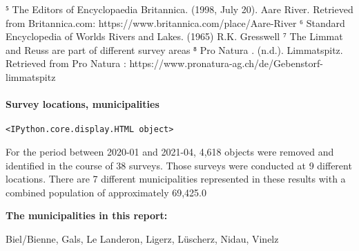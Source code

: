 \documentclass[11pt]{article}
\begin{document}
{⁵ The Editors of Encyclopaedia Britannica. (1998, July 20). Aare River.
Retrieved from Britannica.com:
https://www.britannica.com/place/Aare-River ⁶ Standard Encyclopedia of
Worlds Rivers and Lakes. (1965) R.K. Gresswell ⁷ The Limmat and Reuss
are part of different survey areas ⁸ Pro Natura . (n.d.). Limmatspitz.
Retrieved from Pro Natura :
https://www.pronatura-ag.ch/de/Gebenstorf-limmatspitz}

    

    \hypertarget{survey-locations-municipalities}{%
\paragraph{Survey locations,
municipalities}\label{survey-locations-municipalities}}

            \begin{tcolorbox}[breakable, size=fbox, boxrule=.5pt, pad at break*=1mm, opacityfill=0]
\begin{Verbatim}[commandchars=\\\{\}]
<IPython.core.display.HTML object>
\end{Verbatim}
\end{tcolorbox}
         
            
    
    For the period between 2020-01 and 2021-04, 4,618 objects were removed
and identified in the course of 38 surveys. Those surveys were conducted
at 9 different locations. There are 7 different municipalities
represented in these results with a combined population of approximately
69,425.0

    
 
            
    
    \textbf{The municipalities in this report:}

Biel/Bienne, Gals, Le Landeron, Ligerz, Lüscherz, Nidau, Vinelz

    
\end{document}
